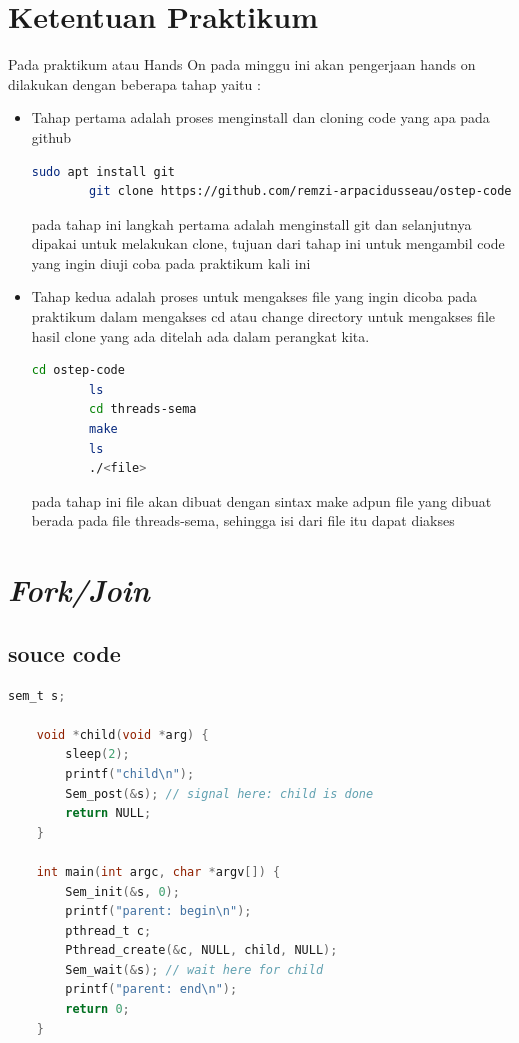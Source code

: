\documentclass[11pt,a4paper]{article}
\begin{document}
\section{Ketentuan Praktikum}
Pada praktikum atau Hands On pada minggu ini akan pengerjaan hands on dilakukan dengan beberapa tahap yaitu :
\begin{itemize}
    \item Tahap pertama adalah proses menginstall dan cloning code yang apa pada github
        \begin{lstlisting}[language=Bash,label={labelkode}]
        sudo apt install git
        git clone https://github.com/remzi-arpacidusseau/ostep-code.git
        \end{lstlisting}
        pada tahap ini langkah pertama adalah menginstall git dan selanjutnya dipakai untuk melakukan clone, tujuan dari tahap ini untuk mengambil code yang ingin diuji coba pada praktikum kali ini
    \item Tahap kedua adalah proses untuk mengakses file yang ingin dicoba pada praktikum dalam mengakses cd atau change directory untuk mengakses file hasil clone yang ada ditelah ada dalam perangkat kita.
    \begin{lstlisting}[language=Bash,label={labelkode}]
        cd ostep-code
        ls
        cd threads-sema
        make
        ls
        ./<file>
        \end{lstlisting}
        pada tahap ini file akan dibuat dengan sintax make adpun file yang dibuat berada pada file threads-sema, sehingga isi dari file itu dapat diakses
    
\end{itemize}
\section{\textit{Fork/Join}}
\subsection{souce code}
\begin{lstlisting}[language=C]
	sem_t s;

	void *child(void *arg) {
		sleep(2);
		printf("child\n");
		Sem_post(&s); // signal here: child is done
		return NULL;
	}

	int main(int argc, char *argv[]) {
		Sem_init(&s, 0); 
		printf("parent: begin\n");
		pthread_t c;
		Pthread_create(&c, NULL, child, NULL);
		Sem_wait(&s); // wait here for child
		printf("parent: end\n");
		return 0;
	}
    

\end{lstlisting}
\end{document}
